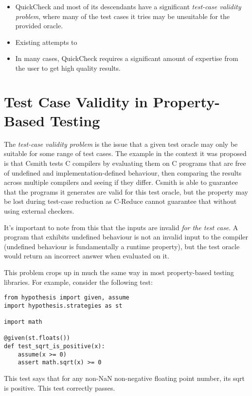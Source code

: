 \begin{itemize}
\item QuickCheck and most of its descendants have a significant \emph{test-case validity problem}\cite{DBLP:conf/pldi/RegehrCCEEY12},
where many of the test cases it tries may be unsuitable for the provided oracle.
\item Existing attempts to 
\item In many cases,
QuickCheck requires a significant amount of expertise from the user to get high quality results.
\end{itemize}

\section{Test Case Validity in Property-Based Testing}\label{sec:validity}

The \emph{test-case validity problem}\cite{DBLP:conf/pldi/RegehrCCEEY12} is the issue that a given test oracle may only be suitable for some range of test cases.
The example in the context it was proposed is that Csmith tests C compilers by evaluating them on C programs that are free of undefined and implementation-defined behaviour,
then comparing the results across multiple compilers and seeing if they differ.
Csmith is able to guarantee that the programs it generates are valid for this test oracle,
but the property may be lost during test-case reduction as C-Reduce cannot guarantee that without using external checkers.

It's important to note from this that the inputs are invalid \emph{for the test case}.
A program that exhibits undefined behaviour is not an invalid input to the compiler (undefined behaviour is fundamentally a runtime property),
but the test oracle would return an incorrect answer when evaluated on it.

This problem crops up in much the same way in most property-based testing libraries.
For example,
consider the following test:

\begin{lstlisting}
from hypothesis import given, assume
import hypothesis.strategies as st

import math

@given(st.floats())
def test_sqrt_is_positive(x):
    assume(x >= 0)
    assert math.sqrt(x) >= 0
\end{lstlisting}

This test says that for any non-NaN non-negative floating point number,
its sqrt is positive.
This test correctly passes.

